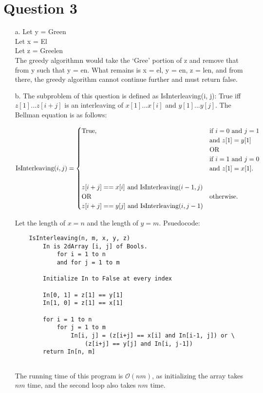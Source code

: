 \documentclass[12pt]{article}
\begin{document}
\section*{Question 3} 
\begin{enumerate}
    \item[a.] Let y = Green\\
              Let x = El\\
              Let z = Greelen\\
 
              The greedy algorithmn would take the `Gree' portion of z and remove that from y such that y = en.
              What remains is x = el, y = en, z = len, and from there, the greedy algorithm cannot continue further
              and must return false.

    \item[b.] The subproblem of this question is defined as IsInterleaving(i, j): True iff $z[1] ... z[i+j]$ is an interleaving of $x[1] ... x[i]$ and $y[1] ... y[j]$. The Bellman equation is as follows:
    
    \begin{equation*}
        \text{IsInterleaving}(i,j)=\begin{cases}
    \text{True}, & \text{if $i = 0$ and $j = 1$} \\ & \text{and $z[1] = y[1]$} \\ & \text{OR} \\ & \text{if $i = 1$ and $j = 0$} \\ & \text{and $z[1] = x[1]$}.\\ \\
    z[i+j] == x[i] \newline \text{ and IsInterleaving}(i-1, j) \\ \text{OR} & \text{otherwise}. \\ z[i+j] == y[j] \text{ and IsInterleaving}(i, j-1)
    \end{cases}
    \end{equation*}
    
    Let the length of $x = n$ and the length of $y = m$. Psuedocode: 
    \begin{verbatim}
    IsInterleaving(n, m, x, y, z)
        In is 2dArray [i, j] of Bools.
            for i = 1 to n
            and for j = 1 to m
        
        Initialize In to False at every index
        
        In[0, 1] = z[1] == y[1]
        In[1, 0] = z[1] == x[1]
        
        for i = 1 to n
            for j = 1 to m
                In[i, j] = (z[i+j] == x[i] and In[i-1, j]) or \
                    (z[i+j] == y[j] and In[i, j-1])
        return In[n, m]
            
    \end{verbatim}
    The running time of this program is $\mathcal{O}(nm)$, as initializing the array takes $nm$ time, and the second loop also takes $nm$ time.

\end{enumerate}
\end{document}
